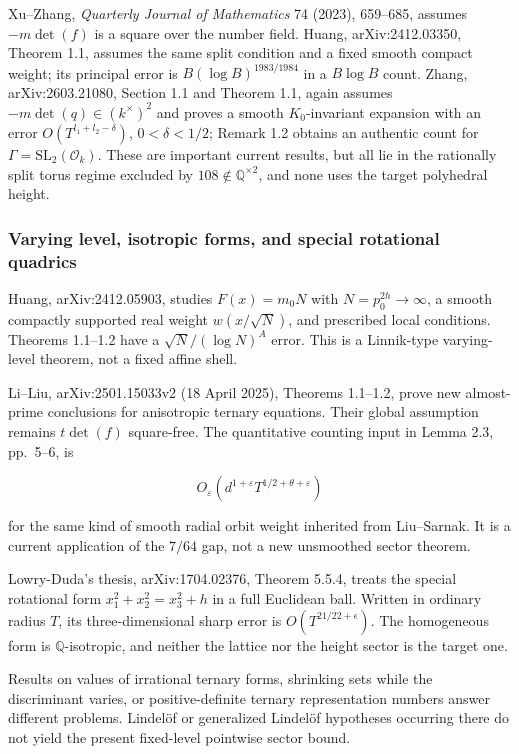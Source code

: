 Xu--Zhang, \emph{Quarterly Journal of Mathematics} 74 (2023), 659--685, assumes \(-m\det(f)\) is a square over the number field. Huang, arXiv:2412.03350, Theorem 1.1, assumes the same split condition and a fixed smooth compact weight; its principal error is \(B(\log B)^{1983/1984}\) in a \(B\log B\) count. Zhang, arXiv:2603.21080, Section 1.1 and Theorem 1.1, again assumes \(-m\det(q)\in(k^\times)^2\) and proves a smooth \(K_0\)-invariant expansion with an error \(O(T^{l_1+l_2-\delta})\), \(0<\delta<1/2\); Remark 1.2 obtains an authentic count for \(\Gamma=\mathrm{SL}_2(\mathcal O_k)\). These are important current results, but all lie in the rationally split torus regime excluded by \(108\notin\mathbb Q^{\times2}\), and none uses the target polyhedral height.

\subsubsection{Varying level, isotropic forms, and special rotational quadrics}\label{koide-lit-varying-level-isotropic-forms-and-special-rotational-quadrics}

Huang, arXiv:2412.05903, studies \(F(x)=m_0N\) with \(N=p_0^{2h}\to\infty\), a smooth compactly supported real weight \(w(x/\sqrt N)\), and prescribed local conditions. Theorems 1.1--1.2 have a \(\sqrt N/(\log N)^A\) error. This is a Linnik-type varying-level theorem, not a fixed affine shell.

Li--Liu, arXiv:2501.15033v2 (18 April 2025), Theorems 1.1--1.2, prove new almost-prime conclusions for anisotropic ternary equations. Their global assumption remains \(t\det(f)\) square-free. The quantitative counting input in Lemma 2.3, pp.~5--6, is

\[
 O_\varepsilon(d^{1+\varepsilon}T^{1/2+\theta+\varepsilon})
\]

for the same kind of smooth radial orbit weight inherited from Liu--Sarnak. It is a current application of the \(7/64\) gap, not a new unsmoothed sector theorem.

Lowry-Duda's thesis, arXiv:1704.02376, Theorem 5.5.4, treats the special rotational form \(x_1^2+x_2^2=x_3^2+h\) in a full Euclidean ball. Written in ordinary radius \(T\), its three-dimensional sharp error is \(O(T^{21/22+\epsilon})\). The homogeneous form is \(\mathbb Q\)-isotropic, and neither the lattice nor the height sector is the target one.

Results on values of irrational ternary forms, shrinking sets while the discriminant varies, or positive-definite ternary representation numbers answer different problems. Lindelöf or generalized Lindelöf hypotheses occurring there do not yield the present fixed-level pointwise sector bound.


